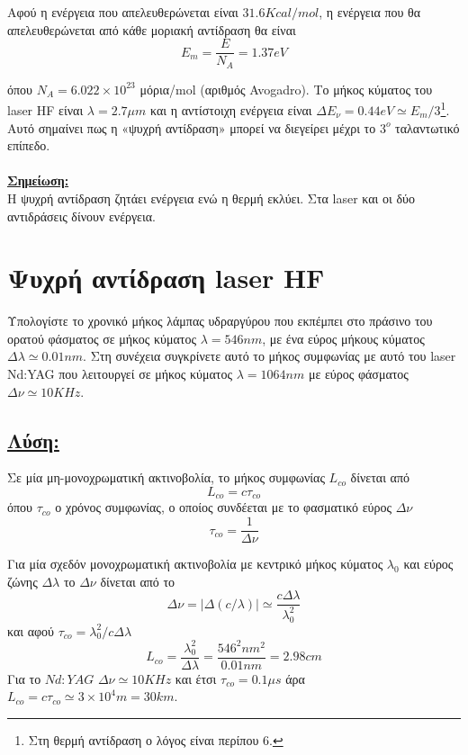 \documentclass[a4paper,11pt,titlepage]{article}
\numberwithin{equation}{section} %
\begin{document}
Αφού η ενέργεια που απελευθερώνεται είναι $31.6Kcal/mol$, η ενέργεια που θα απελευθερώνεται από κάθε μοριακή αντίδραση θα είναι
\begin{equation*}
 E_m=\dfrac{E}{N_A}=1.37eV
\end{equation*}

όπου $N_A=6.022\times10^{23}$ μόρια/mol (αριθμός Avogadro). Το μήκος κύματος του laser HF είναι $\lambda=2.7\mu m$ και η αντίστοιχη ενέργεια είναι $\Delta E_{\nu}=0.44eV\simeq E_m/3$\footnote{Στη θερμή αντίδραση ο λόγος είναι περίπου 6.}. Αυτό σημαίνει πως η «ψυχρή αντίδραση» μπορεί να διεγείρει μέχρι το $3^ο$ ταλαντωτικό επίπεδο.\\\\
\textbf{\underline{Σημείωση:}}\\
Η ψυχρή αντίδραση ζητάει ενέργεια ενώ η θερμή εκλύει. Στα laser και οι δύο αντιδράσεις δίνουν ενέργεια. 
\newpage

\section{Ψυχρή αντίδραση laser HF}

Υπολογίστε το χρονικό μήκος λάμπας υδραργύρου που εκπέμπει στο πράσινο του ορατού φάσματος σε μήκος κύματος $\lambda=546nm$, με ένα εύρος μήκους κύματος $\Delta\lambda\simeq0.01nm$. Στη συνέχεια συγκρίνετε αυτό το μήκος συμφωνίας με αυτό του laser Nd:YAG που λειτουργεί σε μήκος κύματος $\lambda=1064nm$ με εύρος φάσματος $\Delta\nu\simeq10KHz$.

\subsection*{\underline{Λύση:}}

Σε μία μη-μονοχρωματική ακτινοβολία, το μήκος συμφωνίας $L_{co}$ δίνεται από 
\begin{equation*}
 L_{co}=c\tau_{co}
\end{equation*}
όπου $\tau_{co}$ ο χρόνος συμφωνίας, ο οποίος συνδέεται με το φασματικό εύρος $\Delta\nu$
\begin{equation*}
 \tau_{co}=\dfrac{1}{\Delta\nu}
\end{equation*}

Για μία σχεδόν μονοχρωματική ακτινοβολία με κεντρικό μήκος κύματος $\lambda_0$ και εύρος ζώνης $\Delta\lambda$ το $\Delta\nu$ δίνεται από το
\begin{equation*}
 \Delta\nu=|\Delta(c/\lambda)|\simeq \dfrac{c\Delta\lambda}{\lambda^2_0}
\end{equation*}
και αφού $\tau_{co}=\lambda_0^2/c\Delta\lambda$
\begin{equation*}
 L_{co}=\dfrac{\lambda_0^2}{\Delta\lambda}=\dfrac{546^2nm^2}{0.01nm}=2.98cm
\end{equation*}
Για το $Nd:YAG$ $\Delta\nu\simeq10KHz$ και έτσι $\tau_{co}=0.1\mu s$ άρα $L_{co}=c\tau_{co}\simeq3\times10^4m=30km$.
\end{document}

